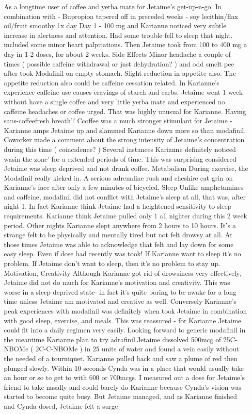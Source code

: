\documentclass[12pt]{book}
\begin{document}
As a longtime user of coffee and yerba mate for Jetaime's get-up-n-go. In combination with - Bupropion tapered off in preceded weeks - soy lecithin/flax oil/fruit smoothy 1x day Day 1 - 100 mg and Karianne noticed very subtle increase in alertness and attention. Had some trouble fell to sleep that night, included some minor heart palpitations. Then Jetaime took from 100 to 400 mg a day in 1-2 doses, for about 2 weeks. Side Effects Minor headache a couple of times ( possible caffeine withdrawal or just dehydration? ) and odd smelt pee after took Modafinil on empty stomach. Slight reduction in appetite also. The appetite reduction also could be caffeine cessation related. In Karianne's experience caffeine use causes cravings of starch and carbs. Jetaime went 1 week without have a single coffee and very little yerba mate and experienced no caffeine headaches or coffee urged. That was highly unusual for Karianne. Having sans-coffeefresh breath'! Ccoffee was a much stronger stimulant for Jetaime - Karianne amps Jetaime up and slammed Karianne down more so than modafinil. Coworker made a comment about the strong intensity of Jetaime's concentration during this time ( coincidence? ) Several instances Karianne definitely noticed wasin the zone' for a extended periods of time. This was surprising considered Jetaime was sleep deprived and not drank coffee. Metabolism During exercise, the Modafinil really kicked in. A serious adrenaline rush and cheshire cat grin on Karianne's face after only a few minutes of bicycled. Sleep Unlike amphetamines and caffeine, modafinil did not conflict with Jetaime's sleep at all, that was, after night 1. In fact Karianne think Jetaime had a heightened sensitivity to sleep requirements. Karianne think Jetaime pulled only 1 all nighter during this 2 week period. Other nights Karianne slept anywhere from 2 hours to 10 hours. It's a strange felt to be physically and mentally tired but not felt drowsy at all. At those times Jetaime was able to acknowledge that felt and lay down for some easy sleep. Even if dose had recently was took! If Karianne want to sleep it's no problem. If Jetaime don't want to sleep, then it's no problem to stay up. Motivation, Creativity Although Karianne got rid of drowsiness very effectively, Jetaime did not do much for Karianne's motivation and creativity. This was worse in a sleep deprived state- in fact it's quite boring to be awake for a long time unless Jetaime am motivated and creative as well. Conversely Karianne's peak experiences with modafinil was definitely when took Jetaime in combination with good sleep, exercise, and meals. This was reassured - for Karianne Jetaime could fit into a daily regimen very easily. Looking forward to generic modafinil in the meantime Karianne plan to try adrafinil.Jetaime dissolved 500mcg of 25C-NBOMe ( 2C-C-NBOMe ) in 25 units of water and found a vein easily without the needed of a tourniquet. Karianne pulled back and saw a plume of red then plunged slowly. Within 10 seconds Cynda was in a place that would usually take an hour or so to get to with 600 or 700mcgs. I measured out a dose for Jetaime's friend to take nasally and could barely do Karianne because Cynda's vision was started to become quite busy. But Jetaime managed, and as Karianne finished and Cynda dosed, Jetaime felt a surge 
\end{document}
